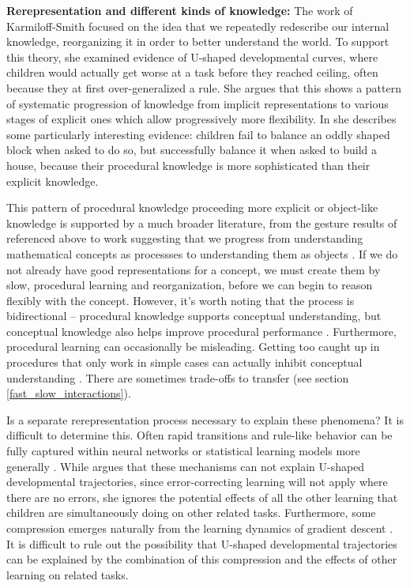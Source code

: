 \textbf{Rerepresentation and different kinds of knowledge:} The work of Karmiloff-Smith \citep[e.g.][]{Karmiloff-Smith1986, Karmiloff-Smith1992, Clark1993} focused on the idea that we repeatedly redescribe our internal knowledge, reorganizing it in order to better understand the world. To support this theory, she examined evidence of U-shaped developmental curves, where children would actually get worse at a task before they reached ceiling, often because they at first over-generalized a rule. She argues that this shows a pattern of systematic progression of knowledge from implicit representations to various stages of explicit ones which allow progressively more flexibility. In \citet{Karmiloff-Smith1986} she describes some particularly interesting evidence: children fail to balance an oddly shaped block when asked to do so, but successfully balance it when asked to build a house, because their procedural knowledge is more sophisticated than their explicit knowledge. \par 
This pattern of procedural knowledge proceeding more explicit or object-like knowledge is supported by a much broader literature, from the gesture results of \citet{Goldin-Meadow1993} referenced above to work suggesting that we progress from understanding mathematical concepts as processses to understanding them as objects \citep{Dubinsky1991, Hazzan1999}. If we do not already have good representations for a concept, we must create them by slow, procedural learning and reorganization, before we can begin to reason flexibly with the concept. However, it's worth noting that the process is bidirectional -- procedural knowledge supports conceptual understanding, but conceptual knowledge also helps improve procedural performance \citep{Rittle-Johnson2001}. Furthermore, procedural learning can occasionally be misleading. Getting too caught up in procedures that only work in simple cases can actually inhibit conceptual understanding \citep{McNeil2005}. There are sometimes trade-offs to transfer (see section \ref{fast_slow_interactions}). \par 
Is a separate rerepresentation process necessary to explain these phenomena? It is difficult to determine this. Often rapid transitions and rule-like behavior can be fully captured within neural networks or statistical learning models more generally \citep[e.g.][]{McClelland1999, McClelland2002, Schapiro2009, Aslin2012}. While \citet{Karmiloff-Smith1992} argues that these mechanisms can not explain U-shaped developmental trajectories, since error-correcting learning will not apply where there are no errors, she ignores the potential effects of all the other learning that children are simultaneously doing on other related tasks. Furthermore, some compression emerges naturally from the learning dynamics of gradient descent \citep{Tishby2015, Shwartz-Ziv2017, Achille2017}. It is difficult to rule out the possibility that U-shaped developmental trajectories can be explained by the combination of this compression and the effects of other learning on related tasks. \par
